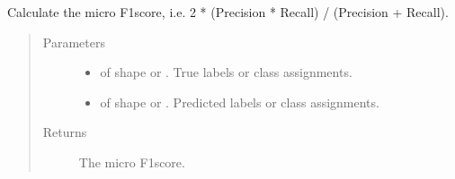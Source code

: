 \documentclass[letterpaper,10pt,english]{sphinxmanual}
\begin{document}
\begin{fulllineitems}
\label{\detokenize{pusion.evaluation.evaluation_metrics:pusion.evaluation.evaluation_metrics.micro_f1}}
\sphinxAtStartPar
Calculate the micro F1\sphinxhyphen{}score, i.e. 2 * (Precision * Recall) / (Precision + Recall).
\begin{quote}\begin{description}
\item[{Parameters}] \leavevmode\begin{itemize}
\item {} 
\sphinxAtStartPar
{} \textendash{}  of shape  or . True labels or class assignments.

\item {} 
\sphinxAtStartPar
{} \textendash{}  of shape  or . Predicted labels or
class assignments.

\end{itemize}

\item[{Returns}] \leavevmode
\sphinxAtStartPar
The micro F1\sphinxhyphen{}score.

\end{description}\end{quote}

\end{fulllineitems}

\end{document}
